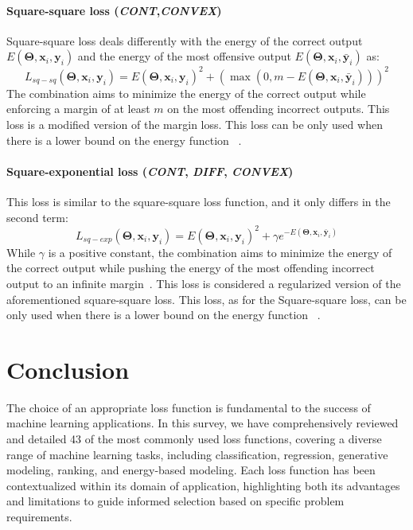 \documentclass[sn-mathphys-num]{sn-jnl}%
\newcommand \cont{\textit{CONT}}
\newcommand \diff{\textit{DIFF}}
\newcommand \conv{\textit{CONVEX}}
\renewcommand\vec{\mathbf}
\begin{document}
\paragraph{Square-square loss (\cont,\conv)}
Square-square loss deals differently with the energy of the correct output $E(\vec{\Theta},\vec{x}_i,\vec{y}_i)$ and the energy of the most offensive output $E(\vec{\Theta},\vec{x}_i,\bar{\vec{y}}_i)$ as:
\begin{equation}
    L_{sq-sq} (\vec{\Theta},\vec{x}_i,\vec{y}_i) = E(\vec{\Theta},\vec{x}_i,\vec{y}_i)^2 + (\max(0,m-E(\vec{\Theta},\vec{x}_i,\bar{\vec{y}}_i)))^2
\end{equation}
The combination aims to minimize the energy of the correct output while enforcing a margin of at least $m$ on the most offending incorrect outputs.
This loss is a modified version of the margin loss. This loss can be only used when there is a lower bound on the energy function ~\cite{lecun2005loss,hadsell2006dimensionality}.
\paragraph{Square-exponential loss (\cont, \diff, \conv)}
This loss is similar to the square-square loss function, and it only differs in the second term: 
\begin{equation}
    L_{sq-exp} (\vec{\Theta},\vec{x}_i,\vec{y}_i) = E(\vec{\Theta},\vec{x}_i,\vec{y}_i)^2 + \gamma e^{-E(\vec{\Theta},\vec{x}_i,\bar{\vec{y}}_i)}
\end{equation}
While $\gamma$ is a positive constant, the combination aims to minimize the energy of the correct output while pushing the energy of the most offending incorrect output to an infinite margin~\cite{lecun2005loss,chopra2005learning,osadchy2004synergistic}.
This loss is considered a regularized version of the aforementioned square-square loss. This loss, as for the Square-square loss, can be only used when there is a lower bound on the energy function ~\cite{lecun2005loss,hadsell2006dimensionality}.
\section{Conclusion} \label{sec:conclusion}

The choice of an appropriate loss function is fundamental to the success of machine learning applications. In this survey, we have comprehensively reviewed and detailed 43 of the most commonly used loss functions, covering a diverse range of machine learning tasks, including classification, regression, generative modeling, ranking, and energy-based modeling. Each loss function has been contextualized within its domain of application, highlighting both its advantages and limitations to guide informed selection based on specific problem requirements.
\end{document}
